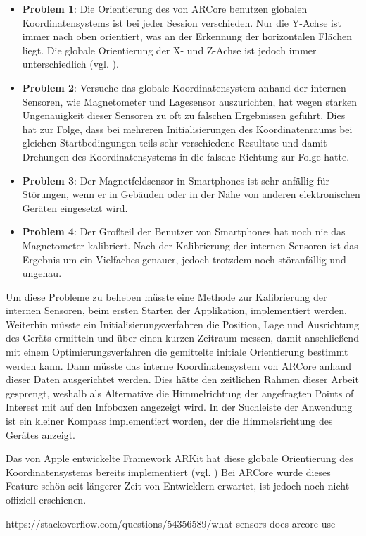 \begin{itemize}

\item \textbf{Problem 1}: Die Orientierung des von ARCore benutzen globalen Koordinatensystems ist bei jeder Session verschieden. Nur die Y-Achse ist immer nach oben orientiert, was an der Erkennung der horizontalen Flächen liegt. Die globale Orientierung der X- und Z-Achse ist jedoch immer unterschiedlich (vgl. \cite{arcore_geo}).

\item \textbf{Problem 2}: Versuche das globale Koordinatensystem anhand der internen Sensoren, wie Magnetometer und Lagesensor auszurichten, hat wegen starken Ungenauigkeit dieser Sensoren zu oft zu falschen Ergebnissen geführt. Dies hat zur Folge, dass bei mehreren Initialisierungen des Koordinatenraums bei gleichen Startbedingungen teils sehr verschiedene Resultate und damit Drehungen des Koordinatensystems in die falsche Richtung zur Folge hatte. 

\item \textbf{Problem 3}: Der Magnetfeldsensor in Smartphones ist sehr anfällig für Störungen, wenn er in Gebäuden oder in der Nähe von anderen elektronischen Geräten eingesetzt wird.

\item \textbf{Problem 4}: Der Großteil der Benutzer von Smartphones hat noch nie das Magnetometer kalibriert. Nach der Kalibrierung der internen Sensoren ist das Ergebnis um ein Vielfaches genauer, jedoch trotzdem noch störanfällig und ungenau.
\end{itemize}

Um diese Probleme zu beheben müsste eine Methode zur Kalibrierung der internen Sensoren, beim ersten Starten der Applikation, implementiert werden. Weiterhin müsste ein Initialisierungsverfahren die Position, Lage und Ausrichtung des Geräts ermitteln und über einen kurzen Zeitraum messen, damit anschließend mit einem Optimierungsverfahren die gemittelte initiale Orientierung bestimmt werden kann. Dann müsste das interne Koordinatensystem von ARCore anhand dieser Daten ausgerichtet werden. Dies hätte den zeitlichen Rahmen dieser Arbeit gesprengt, weshalb als Alternative die Himmelrichtung der angefragten Points of Interest mit auf den Infoboxen angezeigt wird. In der Suchleiste der Anwendung ist ein kleiner Kompass implementiert worden, der die Himmelsrichtung des Gerätes anzeigt. 

Das von Apple entwickelte Framework ARKit hat diese globale Orientierung des Koordinatensystems bereits implementiert (vgl. \cite{arkit_global}) Bei ARCore wurde dieses Feature schön seit längerer Zeit von Entwicklern erwartet, ist jedoch noch nicht offiziell erschienen.

https://stackoverflow.com/questions/54356589/what-sensors-does-arcore-use







